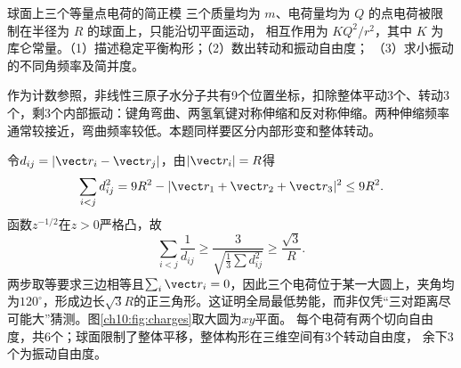 \begin{origexamplebox}{球面上三个等量点电荷的简正模}\label{ch10:ex:charges}
三个质量均为 $m$、电荷量均为 $Q$ 的点电荷被限制在半径为 $R$ 的球面上，只能沿切平面运动，
相互作用为 $KQ^2/r^2$，其中 $K$ 为库仑常量。（1）描述稳定平衡构形；（2）数出转动和振动自由度；
（3）求小振动的不同角频率及简并度。

作为计数参照，非线性三原子水分子共有9个位置坐标，扣除整体平动3个、转动3个，剩3个内部振动：键角弯曲、两氢氧键对称伸缩和反对称伸缩。两种伸缩频率通常较接近，弯曲频率较低。本题同样要区分内部形变和整体转动。
\end{origexamplebox}
\begin{xesolution}
令$d_{ij}=|\vect r_i-\vect r_j|$，由$|\vect r_i|=R$得
\[
 \sum_{i<j}d_{ij}^2=9R^2-|\vect r_1+\vect r_2+\vect r_3|^2\leq9R^2.
\]
函数$z^{-1/2}$在$z>0$严格凸，故
\[
 \sum_{i<j}\frac1{d_{ij}}\geq
 \frac3{\sqrt{\tfrac13\sum d_{ij}^2}}\geq\frac{\sqrt3}{R}.
\]
两步取等要求三边相等且$\sum_i\vect r_i=0$，因此三个电荷位于某一大圆上，夹角均为$120^\circ$，形成边长$\sqrt3R$的正三角形。这证明全局最低势能，而非仅凭“三对距离尽可能大”猜测。图\ref{ch10:fig:charges}取大圆为$xy$平面。
\chTenChargesFigure
每个电荷有两个切向自由度，共6个；球面限制了整体平移，整体构形在三维空间有3个转动自由度，
余下3个为振动自由度。


\end{xesolution}
